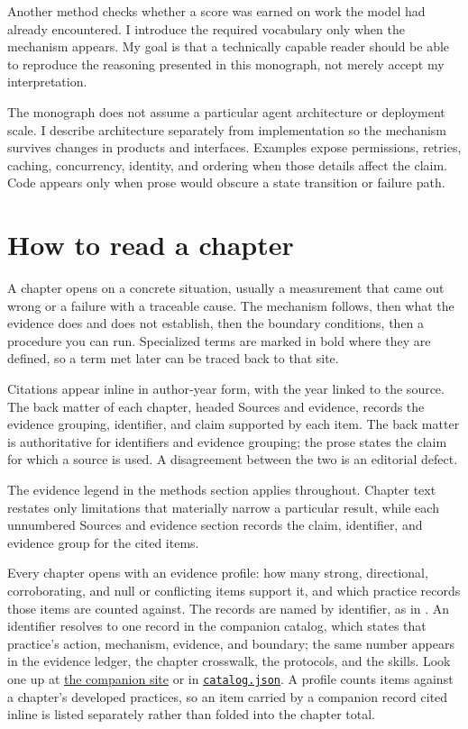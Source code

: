 Another method checks whether a score was earned on work the model had already encountered. I introduce the required vocabulary only when the mechanism appears. My goal is that a technically capable reader should be able to reproduce the reasoning presented in this monograph, not merely accept my interpretation.

The monograph does not assume a particular agent architecture or deployment scale. I describe architecture separately from implementation so the mechanism survives changes in products and interfaces. Examples expose permissions, retries, caching, concurrency, identity, and ordering when those details affect the claim. Code appears only when prose would obscure a state transition or failure path.

\hypertarget{how-to-read-a-chapter}{%
\section{How to read a chapter}\label{how-to-read-a-chapter}}

A chapter opens on a concrete situation, usually a measurement that came out wrong or a failure with a traceable cause. The mechanism follows, then what the evidence does and does not establish, then the boundary conditions, then a procedure you can run. Specialized terms are marked in bold where they are defined, so a term met later can be traced back to that site.

Citations appear inline in author-year form, with the year linked to the source. The back matter of each chapter, headed Sources and evidence, records the evidence grouping, identifier, and claim supported by each item. The back matter is authoritative for identifiers and evidence grouping; the prose states the claim for which a source is used. A disagreement between the two is an editorial defect.

The evidence legend in the methods section applies throughout. Chapter text restates only limitations that materially narrow a particular result, while each unnumbered Sources and evidence section records the claim, identifier, and evidence group for the cited items.

Every chapter opens with an evidence profile: how many strong, directional, corroborating, and null or conflicting items support it, and which practice records those items are counted against. The records are named by identifier, as in . An identifier resolves to one record in the companion catalog, which states that practice's action, mechanism, evidence, and boundary; the same number appears in the evidence ledger, the chapter crosswalk, the protocols, and the skills. Look one up at \href{https://sjarmak.ai/books/engineering-reliable-coding-agents/companion}{the companion site} or in \href{https://github.com/sjarmak/engineering-reliable-coding-agents/blob/main/companion/catalog.json}{\texttt{catalog.json}}. A profile counts items against a chapter's developed practices, so an item carried by a companion record cited inline is listed separately rather than folded into the chapter total.

